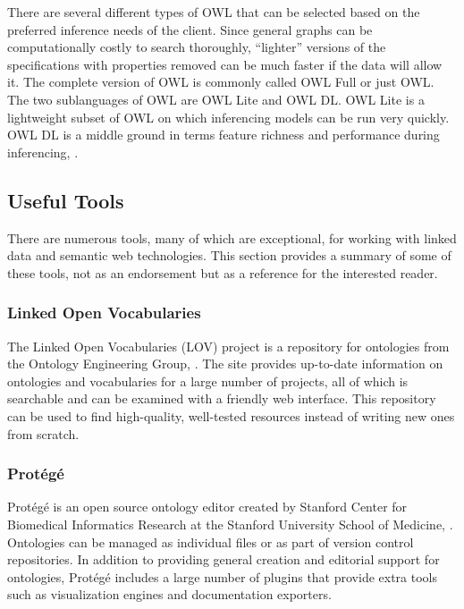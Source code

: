 There are several different types of OWL that can be selected based on the
preferred inference needs of the client. Since general graphs can be
computationally costly to search thoroughly, ``lighter'' versions of the
specifications with properties removed can be much faster if the data will allow
it. The complete version of OWL is commonly called OWL Full or just OWL. The two
sublanguages of OWL are OWL Lite and OWL DL. OWL Lite is a lightweight subset
of OWL on which inferencing models can be run very quickly. OWL DL
is a middle ground in terms feature richness and performance
during inferencing, \cite{owl-syntax}.

\subsection{Useful Tools}

There are numerous tools, many of which are exceptional, for working with linked
data and semantic web technologies. This section provides a summary of some of
these tools, not as an endorsement but as a reference for the interested reader.

\subsubsection{Linked Open Vocabularies}

The Linked Open Vocabularies (LOV) project is a repository for ontologies from
the Ontology Engineering Group, \cite{lov}. The site provides up-to-date
information on ontologies and vocabularies for a large number of projects, all
of which is searchable and can be examined with a friendly web interface. This
repository can be used to find high-quality, well-tested resources instead of
writing new ones from scratch.

\subsubsection{Prot\'eg\'e}

Prot\'eg\'e is an open source ontology editor created by Stanford Center for
Biomedical Informatics Research at the Stanford University School of Medicine,
\cite{protege}. Ontologies can be managed as individual files or as part of
version control repositories. In addition to providing general creation and
editorial support for ontologies, Prot\'eg\'e includes a large number of plugins
that provide extra tools such as visualization engines and documentation
exporters.

